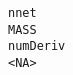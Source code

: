 \documentclass[
  letterpaper,
  DIV=11,
  numbers=noendperiod]{scrreprt}
\begin{document}
\begin{verbatim}
nnet                                                                                                                                                                                                                                                                                                                                                                                                                                                                                                                                                                                                                                                                                                                                                                                                                                                                                                                                                                                                                                                                                                                                                                                                                                                                                                     MASS
numDeriv                                                                                                                                                                                                                                                                                                                                                                                                                                                                                                                                                                                                                                                                                                                                                                                                                                                                                                                                                                                                                                                                                                                                                                                                                                                                                                 <NA>

\end{verbatim}
\end{document}
